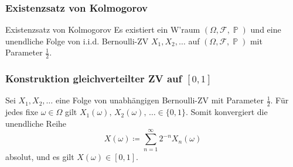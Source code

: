 \documentclass[a4paper,10pt]{article}
\def\F{\mathcal{F}}
\renewcommand{\P}{\operatorname{\mathbb{P}}}
\DeclareMathOperator{\Ber}{Ber}
\DeclareMathOperator{\uniform}{\mathcal{U}}
\numberwithin{equation}{section}
\begin{document}



\subsubsection{Existenzsatz von Kolmogorov}

\begin{mainbox}{Existenzsatz von Kolmogorov}
    Es existiert ein W'raum \( (\Omega, \F, \P) \) und eine unendliche Folge von i.i.d. Bernoulli-ZV \( X_1, X_2, \dots \) auf \( (\Omega, \F, \P) \) mit Parameter \( \frac{1}{2} \).
\end{mainbox}

\subsubsection{Konstruktion gleichverteilter ZV auf \( [0, 1] \)}



Sei \( X_1, X_2, \dots \) eine Folge von unabhängigen Bernoulli-ZV mit Parameter \( \frac{1}{2} \). Für jedes fixe \( \omega \in \Omega \) gilt \( X_1(\omega), \, X_2(\omega), \, \dots \in \{0, 1\} \). Somit konvergiert die unendliche Reihe
\begin{equation}
    X(\omega) \coloneqq \sum_{n = 1}^\infty 2^{-n} X_n(\omega)
    \label{eq:slides_2_3}
\end{equation}
absolut, und es gilt \( X(\omega) \in [0, 1] \).
\end{document}
